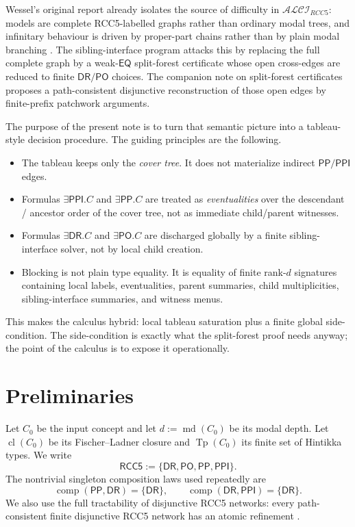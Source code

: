 \documentclass[11pt]{article}
\theoremstyle{remark}
\newcommand{\RCC}{\mathsf{RCC5}}
\newcommand{\DR}{\mathsf{DR}}
\newcommand{\PO}{\mathsf{PO}}
\newcommand{\PP}{\mathsf{PP}}
\newcommand{\PPI}{\mathsf{PPI}}
\newcommand{\EQ}{\mathsf{EQ}}
\newcommand{\cl}{\operatorname{cl}}
\newcommand{\Tp}{\operatorname{Tp}}
\newcommand{\md}{\operatorname{md}}
\newcommand{\comp}{\operatorname{comp}}
\begin{document}
Wessel's original report already isolates the source of difficulty in $\mathcal{ALCI}_{RCC5}$: models are complete RCC5-labelled graphs rather than ordinary modal trees, and infinitary behaviour is driven by proper-part chains rather than by plain modal branching \cite{Wessel2003}. The sibling-interface program attacks this by replacing the full complete graph by a weak-$\EQ$ split-forest certificate whose open cross-edges are reduced to finite $\DR/\PO$ choices. The companion note on split-forest certificates proposes a path-consistent disjunctive reconstruction of those open edges by finite-prefix patchwork arguments.

The purpose of the present note is to turn that semantic picture into a tableau-style decision procedure. The guiding principles are the following.
\begin{itemize}
    \item The tableau keeps only the \emph{cover tree}. It does not materialize indirect $\PP/\PPI$ edges.
    \item Formulas $\exists\PPI.C$ and $\exists\PP.C$ are treated as \emph{eventualities} over the descendant / ancestor order of the cover tree, not as immediate child/parent witnesses.
    \item Formulas $\exists\DR.C$ and $\exists\PO.C$ are discharged globally by a finite sibling-interface solver, not by local child creation.
    \item Blocking is not plain type equality. It is equality of finite rank-$d$ signatures containing local labels, eventualities, parent summaries, child multiplicities, sibling-interface summaries, and witness menus.
\end{itemize}

This makes the calculus hybrid: local tableau saturation plus a finite global side-condition. The side-condition is exactly what the split-forest proof needs anyway; the point of the calculus is to expose it operationally.

\section{Preliminaries}

Let $C_0$ be the input concept and let $d:=\md(C_0)$ be its modal depth. Let $\cl(C_0)$ be its Fischer--Ladner closure and $\Tp(C_0)$ its finite set of Hintikka types. We write
\[
\RCC:=\{\DR,\PO,\PP,\PPI\}.
\]
The nontrivial singleton composition laws used repeatedly are
\[
\comp(\PP,\DR)=\{\DR\},\qquad \comp(\DR,\PPI)=\{\DR\}.
\]
We also use the full tractability of disjunctive RCC5 networks: every path-consistent finite disjunctive RCC5 network has an atomic refinement \cite{Wessel2003,Sibling2026}.
\end{document}
